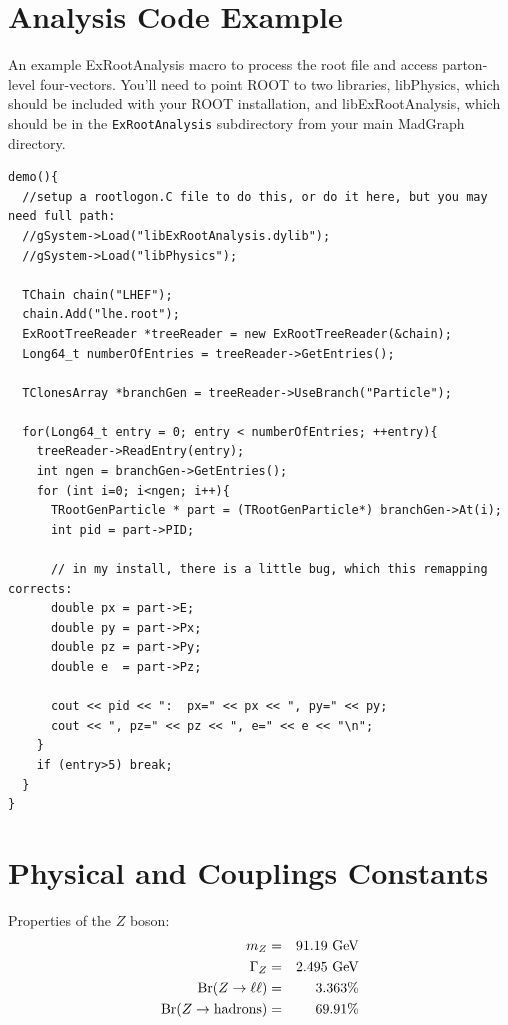 \documentclass[12pt]{article}
\newcommand{\GeV} {\ensuremath{\mathrm{Ge\kern -0.08em V}}}
\begin{document}
\newpage

\appendix

\section{Analysis Code Example}
An example ExRootAnalysis macro to process the root file and access parton-level four-vectors.  You'll need to point ROOT to two libraries, libPhysics, which should be included with your ROOT installation, and libExRootAnalysis, which should be in the {\tt ExRootAnalysis} subdirectory from your main MadGraph directory.

\begin{verbatim}
demo(){
  //setup a rootlogon.C file to do this, or do it here, but you may need full path:
  //gSystem->Load("libExRootAnalysis.dylib");
  //gSystem->Load("libPhysics");

  TChain chain("LHEF");
  chain.Add("lhe.root");
  ExRootTreeReader *treeReader = new ExRootTreeReader(&chain);
  Long64_t numberOfEntries = treeReader->GetEntries();

  TClonesArray *branchGen = treeReader->UseBranch("Particle");  

  for(Long64_t entry = 0; entry < numberOfEntries; ++entry){
    treeReader->ReadEntry(entry);
    int ngen = branchGen->GetEntries();
    for (int i=0; i<ngen; i++){
      TRootGenParticle * part = (TRootGenParticle*) branchGen->At(i);
      int pid = part->PID;

      // in my install, there is a little bug, which this remapping corrects:
      double px = part->E;
      double py = part->Px;
      double pz = part->Py;
      double e  = part->Pz;

      cout << pid << ":  px=" << px << ", py=" << py;
      cout << ", pz=" << pz << ", e=" << e << "\n";
    }
    if (entry>5) break;
  }
}
\end{verbatim}

\newpage

\section{Physical and Couplings Constants}

Properties of the $Z$ boson:
\begin{eqnarray*}
m_Z &=& 91.19~\GeV \\
\Gamma_Z &=& 2.495~\GeV \\
{\rm Br}(Z \to \ell \ell) &=& 3.363\% \\
{\rm Br}(Z \to {\rm hadrons}) &=& 69.91\%
\end{eqnarray*}
\end{document}
